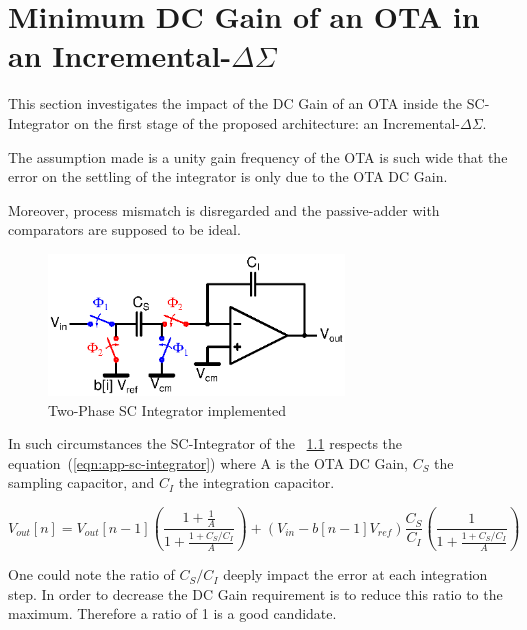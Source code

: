 
\chapter{Minimum DC Gain of an OTA in an Incremental-\(\Delta\Sigma \)}
\label{app:integrator-inl}

This section investigates the impact of the DC Gain of an OTA inside the SC-Integrator on the first stage of the proposed architecture: an Incremental-\(\Delta\Sigma \).

The assumption made is a unity gain frequency of the OTA is such wide that the error on the settling of the integrator is only due to the OTA DC Gain.

Moreover, process mismatch is disregarded and the passive-adder with comparators are supposed to be ideal.

\begin{figure}[htp]
    \centering
    \includegraphics[width=0.7\textwidth]{Appendix2/sc-integrator.ps}
    \caption{Two-Phase SC Integrator implemented}
    \label{fig:app-sc-integrator}
\end{figure}

In such circumstances the SC-Integrator of the \figurename~\ref{fig:app-sc-integrator} respects the equation~(\ref{eqn:app-sc-integrator}) where A is the OTA DC Gain, \(C_S \) the sampling capacitor, and \(C_I \) the integration capacitor.

\begin{equation}
    \label{eqn:app-sc-integrator}
    V_{out}[n] = V_{out}[n-1] \left(\frac{1+\frac{1}{A}}{1+\frac{1+C_S/C_I}{A}}\right) + (V_{in}-b[n-1]V_{ref})\frac{C_S}{C_I}\left(\frac{1}{1+\frac{1+C_S/C_I}{A}}\right)
\end{equation}

One could note the ratio of \(C_S/C_I \) deeply impact the error at each integration step. In order to decrease the DC Gain requirement is to reduce this ratio to the maximum. Therefore a ratio of 1 is a good candidate.

